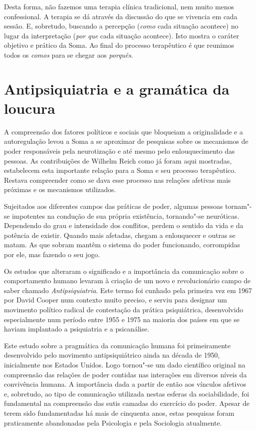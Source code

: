 Desta forma, não fazemos uma terapia clínica tradicional, nem muito
menos confessional. A terapia se dá através da discussão do que se
vivencia em cada sessão. E, sobretudo, buscando a percepção (\emph{como}
cada situação acontece) no lugar da interpretação (\emph{por que} cada
situação acontece). Isto mostra o caráter objetivo e prático da Soma. Ao
final do processo terapêutico é que reunimos todos os \emph{comos} para
se chegar aos \emph{porquês}.

\section{Antipsiquiatria e a gramática da loucura}

A compreensão dos fatores políticos e sociais que bloqueiam a
originalidade e a autoregulação levou a Soma a se aproximar de pesquisas
sobre os mecanismos de poder responsáveis pela neurotização e até mesmo
pelo enlouquecimento das pessoas. As contribuições de Wilhelm Reich como
já foram aqui mostradas, estabelecem esta importante relação para a Soma
e seu processo terapêutico. Restava compreender como se dava esse
processo nas relações afetivas mais próximas e os mecanismos utilizados.

Sujeitados aos diferentes campos das práticas de poder, algumas pessoas
tornam"-se impotentes na condução de sua própria existência, tornando"-se
neuróticas. Dependendo do grau e intensidade dos conflitos, perdem o
sentido da vida e da potência de existir. Quando mais afetadas, chegam a
enlouquecer e outras se matam. As que sobram mantêm o sistema do poder
funcionando, corrompidas por ele, mas fazendo o seu jogo.

Os estudos que alteraram o significado e a importância da comunicação
sobre o comportamento humano levaram à criação de um novo e
revolucionário campo de saber chamado \emph{Antipsiquiatria}. Este termo
foi cunhado pela primeira vez em 1967 por David Cooper num contexto
muito preciso, e serviu para designar um movimento político radical de
contestação da prática psiquiátrica, desenvolvido especialmente num
período entre 1955 e 1975 na maioria dos países em que se haviam
implantado a psiquiatria e a psicanálise.

Este estudo sobre a pragmática da comunicação humana foi primeiramente
desenvolvido pelo movimento antipsiquiátrico ainda na década de 1950,
inicialmente nos Estados Unidos. Logo tornou"-se um dado científico
original na compreensão das relações de poder contidas nas interações em
diversos níveis da convivência humana. A importância dada a partir de
então aos vínculos afetivos e, sobretudo, ao tipo de comunicação utilizada
nestas esferas da sociabilidade, foi fundamental na compreensão das sutis
camadas do exercício do poder. Apesar de terem sido fundamentadas há
mais de cinquenta anos, estas pesquisas foram praticamente abandonadas
pela Psicologia e pela Sociologia atualmente.

